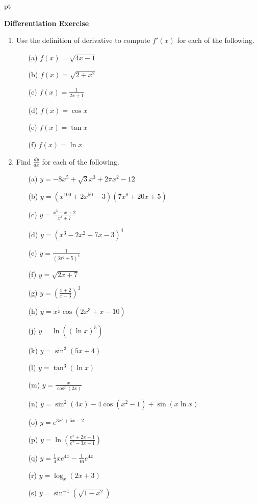 \documentclass[12pt]{article}
\newcommand{\ds}{\displaystyle}
\begin{document}
 pt
\begin{center}
	{\large \bf Differentiation Exercise}\\
	\vspace{2 mm}
\end{center}
\vspace{0.05cm}


\begin{enumerate}
\item
Use the definition of derivative to compute $f'(x)$ for each of the following.
\begin{enumerate}
\item[(a)]
$f(x) = \sqrt{4x-1}$
\item[(b)]
$f(x) = \sqrt{2 + x^2}$
\item[(c)]
$\ds f(x) = \frac{1}{2x + 1}$
\item[(d)]
$f(x) = \cos x$
\item[(e)]
$f(x) = \tan x$
\item[(f)]
$f(x) = \ln x$
\end{enumerate}

\item
Find $\ds \frac{dy}{dx}$ for each of the following.
\begin{enumerate}
\item[(a)] $\displaystyle{y = -8x^{5}+\sqrt{3}x^{3}+2\pi x^{2}-12}$
\item[(b)] $\displaystyle{y = \left(x^{100}+2x^{50}-3\right)\left(7x^{8}+20x+5\right)}$
\item[(c)] $\displaystyle{y = \frac{x^{5}-x+2}{x^{3}+7}}$
\item[(d)] $\displaystyle{y = \left(x^{3}-2x^{2}+7x-3\right)^{4}}$
\item[(e)] $\displaystyle{y = \frac{1}{\left(3x^{2}+5\right)^{4}}}$
\item[(f)] $\displaystyle y = \sqrt{2x+7}$
\item[(g)] $\displaystyle{y = \left(\frac{x+2}{x-3}\right) ^{3}}$
\item[(h)] $\ds y = x^{\frac{1}{2}}\cos\left( 2x^{3}+x-10\right)$
\item[(j)] $\displaystyle y = \ln\left((\ln x)^5\right)$
\item[(k)] $\displaystyle{y = \sin^{3}(5x+4)}$
\item[(l)] $\displaystyle y = \tan^3(\ln x)$
\item[(m)] $\displaystyle y = \frac{x}{\cos^2(2x)}$
\item[(n)] $\ds y = \sin ^{2}(4x) -4\cos\left(x^{2}-1\right) + \sin(x\ln x)$
\item[(o)] $\ds y = e^{3x^{2}+5x-2}$
\item[(p)] $\ds y = \ln\left(\frac{e^{x}+2x+1}{e^{x}-3x-1}\right)$
\item[(q)] $\ds y = \frac{1}{4}xe^{4x} - \frac{1}{16}e^{4x}$
\item[(r)] $\displaystyle y = \log_x(2x + 3)$
\item[(s)] $\ds y = \sin^{-1}\left(\sqrt{1-x^2}\right)$


\end{enumerate}
\end{enumerate}
\end{document}

